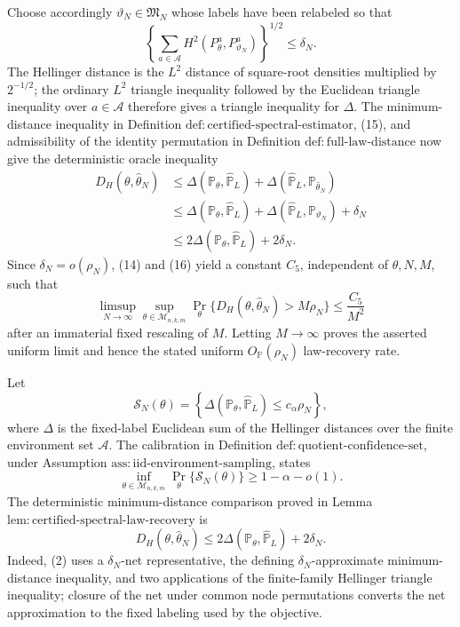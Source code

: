 Choose accordingly \(\vartheta_N\in\mathfrak M_N\) whose labels have been relabeled so that
\[
 \left\{\sum_{a\in\mathcal A}H^2(P_\theta^a,P_{\vartheta_N}^a)\right\}^{1/2}
 \leq\delta_N.
\tag{15}
\]
The Hellinger distance is the \(L^2\) distance of square-root densities multiplied by \(2^{-1/2}\); the ordinary \(L^2\) triangle inequality followed by the Euclidean triangle inequality over \(a\in\mathcal A\) therefore gives a triangle inequality for \(\Delta\).  The minimum-distance inequality in Definition \(\mathrm{def:certified\text{-}spectral\text{-}estimator}\), (15), and admissibility of the identity permutation in Definition \(\mathrm{def:full\text{-}law\text{-}distance}\) now give the deterministic oracle inequality
\[
\begin{aligned}
 D_H(\theta,\widehat\theta_N)
 &\leq\Delta(\mathbb P_\theta,\widehat{\mathbb P}_L)
      +\Delta(\widehat{\mathbb P}_L,\mathbb P_{\widehat\theta_N})\\
 &\leq\Delta(\mathbb P_\theta,\widehat{\mathbb P}_L)
      +\Delta(\widehat{\mathbb P}_L,\mathbb P_{\vartheta_N})+\delta_N\\
 &\leq2\Delta(\mathbb P_\theta,\widehat{\mathbb P}_L)+2\delta_N.
\end{aligned}
\tag{16}
\]
Since \(\delta_N=o(\rho_N)\), (14) and (16) yield a constant \(C_5\), independent of \(\theta,N,M\), such that
\[
 \limsup_{N\to\infty}\sup_{\theta\in\mathcal M_{n,k,m}}
 \Pr_\theta\{D_H(\theta,\widehat\theta_N)>M\rho_N\}
 \leq \frac{C_5}{M^2}
\]
after an immaterial fixed rescaling of \(M\).  Letting \(M\to\infty\) proves the asserted uniform limit and hence the stated uniform \(O_{\mathbb P}(\rho_N)\) law-recovery rate.

Let
\[
 \mathcal S_N(\theta)=
 \left\{\Delta(\mathbb P_\theta,\widehat{\mathbb P}_L)
 \leq c_\alpha\rho_N\right\},
\]
where \(\Delta\) is the fixed-label Euclidean sum of the Hellinger distances over the finite environment set \(\mathcal A\).  The calibration in Definition \(\mathrm{def:quotient\text{-}confidence\text{-}set}\), under Assumption \(\mathrm{ass:iid\text{-}environment\text{-}sampling}\), states
\[
 \inf_{\theta\in\mathcal M_{n,k,m}}
 \Pr_\theta\{\mathcal S_N(\theta)\}
 \geq1-\alpha-o(1).
\tag{1}
\]
The deterministic minimum-distance comparison proved in Lemma \(\mathrm{lem:certified\text{-}spectral\text{-}law\text{-}recovery}\) is
\[
 D_H(\theta,\widehat\theta_N)
 \leq2\Delta(\mathbb P_\theta,\widehat{\mathbb P}_L)+2\delta_N.
\tag{2}
\]
Indeed, (2) uses a \(\delta_N\)-net representative, the defining \(\delta_N\)-approximate minimum-distance inequality, and two applications of the finite-family Hellinger triangle inequality; closure of the net under common node permutations converts the net approximation to the fixed labeling used by the objective.

